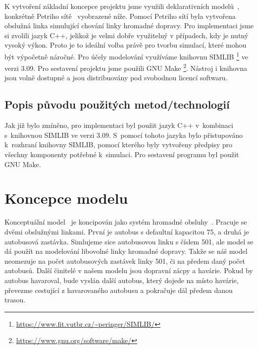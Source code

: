\documentclass[a4paper]{article}
\begin{document}
            K vytvoření základní koncepce projektu jsme využili deklarativních modelů~\cite[snímek 49]{IMS_slides}, konkrétně Petriho sítě~\cite[snímek 123]{IMS_slides} vyobrazené níže.
            Pomocí Petriho sítí byla vytvořena obslužná linka simulující chování linky hromadné dopravy. Pro implementaci jsme si zvolili jazyk C++, jelikož je velmi dobře využitelný v případech, kdy je nutný vysoký výkon. Proto je to ideální volba právě pro tvorbu simulací, které mohou být výpočetně náročné. Pro účely modelování využíváme knihovnu SIMLIB \footnote{\url{https://www.fit.vutbr.cz/~peringer/SIMLIB/}} ve verzi 3.09. Pro sestavení projektu jsme použili GNU Make \footnote{\url{https://www.gnu.org/software/make/}}. Nástroj i knihovna jsou volně dostupné a jsou distribuovány pod svobodnou licencí softwaru.
            

        \subsection{Popis původu použitých metod/technologií}
        \label{subsec:techology}

            Jak již bylo zmíněno, pro implementaci byl použit jazyk C++ v~kombinaci s~knihovnou SIMLIB ve verzi 3.09. S~pomocí tohoto jazyka
            bylo přistupováno k~rozhraní knihovny SIMLIB, pomocí kterého byly vytvořeny předpisy pro všechny komponenty potřebné k~simulaci.
            Pro sestavení programu byl použit GNU Make.

    \section{Koncepce modelu}
    \label{sec:concept}

        Konceptuální model~\cite[snímek 48]{IMS_slides} je koncipován jako systém hromadné obsluhy~\cite[snímek 136]{IMS_slides}.
        Pracuje se dvěmi obslužnými linkami. První je autobus s defaultní kapacitou 75, a druhá je autobusová zastávka. Simlujeme sice autobusovou linku s číslem 501, ale model se dá použít na modelování libovolné linky hromadné dopravy. Takže se náš model neomezuje na počet autobusových zastávek linky 501, či na předem daný počet autobusů. Další činitelé v našem modelu jsou dopravní zácpy a havárie. Pokud by autobus havaroval, bude vyslán další autobus, který dojede na místo havárie, převezme cestující z havarovaného autobusu a pokračuje dál předem danou trasou.
\end{document}
